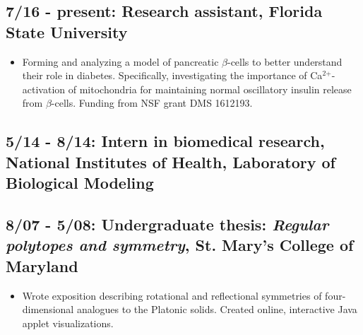 \documentclass[11pt]{cv}
\begin{document}
\subsection*{7/16 - present: Research assistant, Florida State University}
\label{sec:orgheadline7}
\begin{itemize}
\item Forming and analyzing a model of pancreatic \(\beta\)-cells to better understand their role in diabetes. Specifically, investigating the importance of Ca\(^{\text{2+}}\)-activation of mitochondria for maintaining normal oscillatory insulin release from \(\beta\)-cells. Funding from NSF grant DMS 1612193.\\
\end{itemize}
\subsection*{5/14 - 8/14: Intern in biomedical research, National Institutes of Health, Laboratory of Biological Modeling}
\label{sec:orgheadline8}
\subsection*{8/07 - 5/08: Undergraduate thesis: \emph{Regular polytopes and symmetry}, St. Mary's College of Maryland}
\label{sec:orgheadline9}
\begin{itemize}
\item Wrote exposition describing rotational and reflectional symmetries of four-dimensional analogues to the Platonic solids. Created online, interactive Java applet visualizations.\\
\end{itemize}
\end{document}
